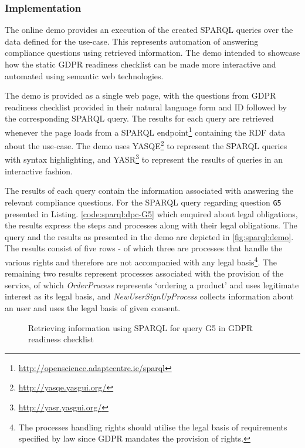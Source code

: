 \subsubsection{Implementation}
The online demo provides an execution of the created SPARQL queries over the data defined for the use-case.
This represents automation of answering compliance questions using retrieved information.
The demo intended to showcase how the static GDPR readiness checklist can be made more interactive and automated using semantic web technologies.

The demo is provided as a single web page, with the questions from GDPR readiness checklist provided in their natural language form and ID followed by the corresponding SPARQL query.
The results for each query are retrieved whenever the page loads from a
SPARQL endpoint\footnote{\url{http://openscience.adaptcentre.ie/sparql}}
containing the RDF data about the use-case.
The demo uses YASQE\footnote{\url{http://yasqe.yasgui.org/}} to represent the SPARQL queries with syntax highlighting, and YASR\footnote{\url{http://yasr.yasgui.org/}} to represent the results of queries in an interactive fashion.

The results of each query contain the information associated with answering the relevant compliance questions. For the SPARQL query regarding question \texttt{G5} presented in Listing. \autoref{code:sparql:dpc-G5} which enquired about legal obligations, the results express the steps and processes along with their legal obligations.
The query and the results as presented in the demo are depicted in \autoref{fig:sparql:demo}.
The results consist of five rows - of which three are processes that handle the various rights and therefore are not accompanied with any legal basis\footnote{The processes handling rights should utilise the legal basis of requirements specified by law since GDPR mandates the provision of rights.}.
The remaining two results represent processes associated with the provision of the service, of which \textit{OrderProcess} represents `ordering a product' and uses legitimate interest as its legal basis, and \textit{NewUserSignUpProcess} collects information about an user and uses the legal basis of given consent.
\begin{figure}[htbp]
\centering
{}
\caption{Retrieving information using SPARQL for query G5 in GDPR readiness checklist}
\label{fig:sparql:demo}
\end{figure}


